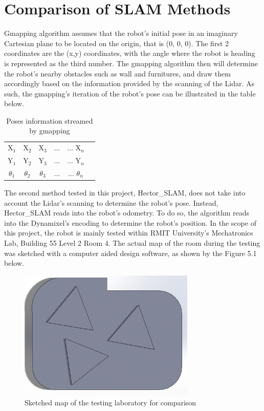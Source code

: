 \documentclass[12pt]{report}
\begin{document}
\section{Comparison of SLAM Methods}
Gmapping algorithm assumes that the robot’s initial pose in an imaginary Cartesian plane to be located on the origin, that is (0, 0, 0). The first 2 coordinates are the (x,y) coordinates, with the angle where the robot is heading is represented as the third number. The gmapping algorithm then will determine the robot’s nearby obstacles such as wall and furnitures, and draw them accordingly based on the information provided by the scanning of the Lidar. As such, the gmapping’s iteration of the robot’s pose can be illustrated in the table below.\par

\begin{table}[H]
    \centering
    \begin{tabular}{cccccc}
         X$_{1}$ & X$_{2}$ & X$_{3}$ & ... & ... X$_{n}$ \\
         Y$_{1}$ & Y$_{2}$ & Y$_{3}$ & ... & ... Y$_{n}$ \\
         $\theta_{1}$ & $\theta_{2}$ & $\theta_{3}$ & ... & ... $\theta_{n}$ \\
         
    \end{tabular}
    \caption{Poses information streamed by gmapping}
    \label{tab:my_label}
\end{table}
The second method tested in this project, Hector\_SLAM, does not take into account the Lidar’s scanning to determine the robot’s pose. Instead, Hector\_SLAM reads into the robot’s odometry. To do so, the algorithm reads into the Dynamixel’s encoding to determine the robot’s position. In the scope of this project, the robot is mainly tested within RMIT University’s Mechatronics Lab, Building 55 Level 2 Room 4. The actual map of the room during the testing was sketched with a computer aided design software, as shown by the Figure 5.1 below.\par
\begin{figure}[H]
        \centering
        \includegraphics[width=0.75\textwidth]{Fig9.png}
        \caption{Sketched map of the testing laboratory for comparison}
        \label{fig:9}
    \end{figure}
\end{document}
